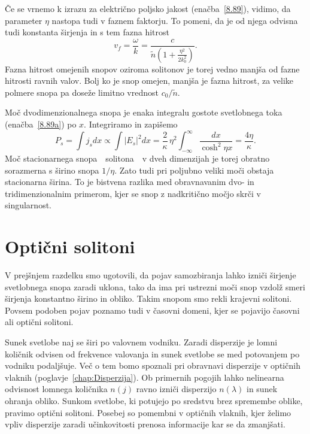 Če se vrnemo k izrazu za električno poljsko jakost (enačba~\ref{8.89}), vidimo, da
parameter $\eta$ nastopa tudi v faznem faktorju. To pomeni, da je od njega odvisna 
tudi konstanta širjenja in s tem fazna hitrost
\begin{equation}
v_{f}=\frac{\omega}{k} = \frac{c}{\tilde{n}\left(1+\frac{\eta^{2}}{2k_{0}^{2}}\right)}.
\end{equation}
Fazna hitrost omejenih snopov oziroma solitonov je torej vedno manjša od fazne hitrosti ravnih valov. 
Bolj ko je snop omejen, manjša je fazna hitrost, za velike polmere snopa pa doseže 
limitno vrednost $c_0/\tilde{n}$.

Moč dvodimenzionalnega snopa je enaka integralu
gostote svetlobnega toka (enačba~\ref{8.89a}) po $x$. Integriramo in zapišemo 
\begin{equation}
P_s = \int j_s dx \propto \int |E_s|^2 dx  = 
\frac{2}{\kappa}\,\eta^{2}\int_{-\infty}^{\infty}\frac{dx}
{\cosh^{2}\eta x}=\frac{4\eta}{\kappa}.
\label{eq:solj}
\end{equation}
Moč stacionarnega snopa~\textendash~solitona~\textendash~v dveh dimenzijah je 
torej obratno sorazmerna s širino snopa $1/\eta$. Zato tudi pri poljubno veliki moči 
obstaja stacionarna širina. To je bistvena razlika med obravnavanim dvo- in 
tridimenzionalnim primerom, kjer se snop z nadkritično močjo skrči v singularnost.

\section{Optični solitoni}
V prejšnjem razdelku smo ugotovili, da pojav samozbiranja lahko izniči širjenje 
svetlobnega snopa zaradi uklona, tako da ima pri
ustrezni moči snop vzdolž smeri širjenja konstantno širino in obliko. Takim snopom 
smo rekli krajevni solitoni. Povsem podoben pojav poznamo tudi v časovni 
domeni, kjer se pojavijo časovni ali optični solitoni. 

Sunek svetlobe  naj se širi po valovnem vodniku. Zaradi disperzije je lomni količnik
odvisen od frekvence valovanja in sunek svetlobe se med potovanjem po vodniku podaljšuje. 
Več o tem bomo spoznali pri 
obravnavi disperzije v optičnih vlaknih (poglavje~\ref{chap:Disperzija}). 
Ob primernih pogojih lahko nelinearna odvisnost lomnega količnika $n(j)$ 
ravno izniči disperzijo $n(\lambda)$  in sunek
ohranja obliko. Sunkom svetlobe, ki potujejo po sredstvu brez spremembe
oblike, pravimo optični solitoni. Posebej so pomembni v optičnih vlaknih, 
kjer želimo  vpliv disperzije zaradi učinkovitosti prenosa
informacije kar se da zmanjšati. 


